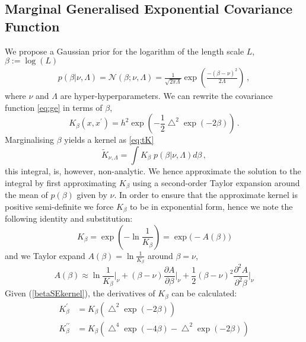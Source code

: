 \documentclass{article}
\newcommand{\tK}{\tilde{K}}
\begin{document}
\subsection{Marginal Generalised Exponential Covariance Function}\label{sec:MGE} 

We propose a Gaussian prior for the logarithm of the length scale $L$, $\beta := \log(L)$
\begin{align}
p(\beta|\nu,\Lambda) = \mathcal{N}(\beta; \nu, \Lambda)= \frac{1}{\sqrt{2 \pi \Lambda}} \exp \left( \frac{ -(\beta - \nu)^2}{2\Lambda} \right) \label{betapdf}\,,
\end{align}
%  
where $\nu$ and $\Lambda$ are hyper-hyperparameters. We can rewrite the covariance function \eqref{eq:ge} in terms of $\beta$,
\begin{equation}\label{betaSEkernel}
K_\beta(x,x^\prime) = h^2 \exp \left( -\frac{1}{2}\bigtriangleup^2 \exp(-2\beta) \right)\,.
\end{equation}
Marginalising $\beta$ yields a kernel as \eqref{eq:tK} 
\begin{equation} \label{kernelmargint} 
\tK_{\nu,\Lambda} = \int K_\beta \; p(\beta|\nu,\Lambda) d\beta\,,
\end{equation} 
this integral, is, however, non-analytic. We hence approximate the solution to the integral by first approximating $K_\beta$ using a second-order Taylor expansion around the mean of $p(\beta)$ given by $\nu$. In order to ensure that the approximate kernel is positive semi-definite we force $K_\beta$ to be in exponential form, hence we note the following identity and substitution:
\begin{equation}
K_\beta = \exp \left( -\ln \frac{1}{K_\beta} \right) = \exp \bigl( -A(\beta) \bigr) \label{Asub}
\end{equation}
and we Taylor expand $A(\beta) = \ln \frac{1}{K_\beta}$ around $\beta=\nu$,
\begin{equation} \label{taylorexpansion}
A(\beta) \approx \ln \frac{1}{K_{\beta}}\bigg|_{\nu} + (\beta-\nu) \frac{\partial{A}}{\partial{\beta}}\bigg|_{\nu} + \frac{1}{2}(\beta-\nu)^2 \frac{\partial^2{A}}{\partial^2{\beta}}\bigg|_{\nu}
\end{equation}
Given (\ref{betaSEkernel}), the derivatives of $K_\beta$ can be calculated:
\begin{align*}
K^\prime_\beta &= K_\beta \left( \bigtriangleup^2 \exp(-2\beta)  \right) \\ 
K^{\prime\prime}_\beta &= K_\beta \left( \bigtriangleup^4 \exp(-4\beta) -  \bigtriangleup^2 \exp(-2\beta) \right)
\end{align*}
\end{document}
